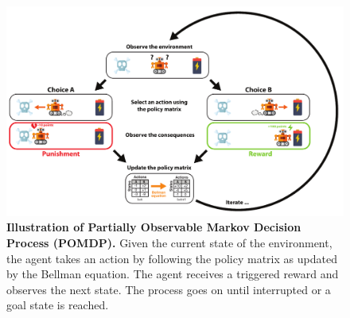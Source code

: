 \documentclass[10pt,letterpaper]{article}
\begin{document}
\begin{figure}[!h]
  \centering
  \includegraphics[width=1.\linewidth]{POMDP_Fig.pdf}
  \caption{\textbf{Illustration of Partially Observable Markov Decision Process (POMDP).} Given the current state of the environment,
    the agent takes an action by following the policy matrix as updated by the Bellman equation. The agent receives a triggered reward and observes the next state. The process goes on until interrupted or a goal state is reached.}
  \label{fig:rl}
\end{figure}
\end{document}
